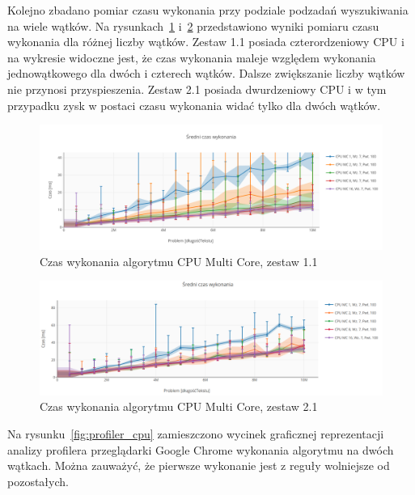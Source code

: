 Kolejno zbadano pomiar czasu wykonania przy podziale podzadań wyszukiwania na wiele wątków. Na rysunkach~\ref{fig:chart_cpu_mc_mean_chrome_damian} i~\ref{fig:chart_cpu_mc_mean_chrome_maja} przedstawiono wyniki pomiaru czasu wykonania dla różnej liczby wątków. Zestaw 1.1 posiada czterordzeniowy CPU i na wykresie widoczne jest, że czas wykonania maleje względem wykonania jednowątkowego dla dwóch i czterech wątków. Dalsze zwiększanie liczby wątków nie przynosi przyspieszenia.
Zestaw 2.1 posiada dwurdzeniowy CPU i w tym przypadku zysk w postaci czasu wykonania widać tylko dla dwóch wątków.


\begin{figure}
    \centering
    \includegraphics[keepaspectratio, width=1.0\linewidth, trim=1.1cm 0.9cm 0.5cm 3.5cm, clip]{benchmarks/nvidia970_chrome/cpu_mc_mean_zoom.png}
    \caption{Czas wykonania algorytmu CPU Multi Core, zestaw 1.1}
    \label{fig:chart_cpu_mc_mean_chrome_damian}
\end{figure}

\begin{figure}
    \centering
    \includegraphics[keepaspectratio, width=1.0\linewidth, trim=0 0 0 2.7cm, clip]{benchmarks/intel_hd520_chrome/cpu_mc_mean.png}
    \caption{Czas wykonania algorytmu CPU Multi Core, zestaw 2.1}
    \label{fig:chart_cpu_mc_mean_chrome_maja}
\end{figure}

Na rysunku~\ref{fig:profiler_cpu} zamieszczono wycinek graficznej reprezentacji analizy profilera przeglądarki Google Chrome wykonania algorytmu na dwóch wątkach. Można zauważyć, że pierwsze wykonanie jest z reguły wolniejsze od pozostałych.

